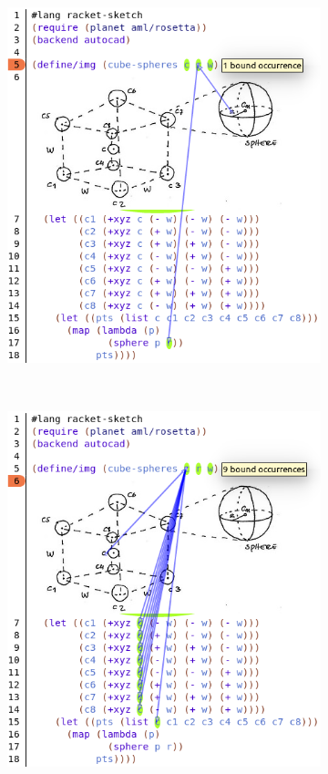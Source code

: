 \begin{figure}
        \centering
        \begin{subfigure}{0.5\textwidth}
                \includegraphics[width=\textwidth]{img/img-code}
                \label{fig:Ncolors}
        \end{subfigure}%
        ~ %
        \begin{subfigure}{0.5\textwidth}
                \includegraphics[width=\textwidth]{img/img-code-2}

\end{subfigure}
\end{figure}
